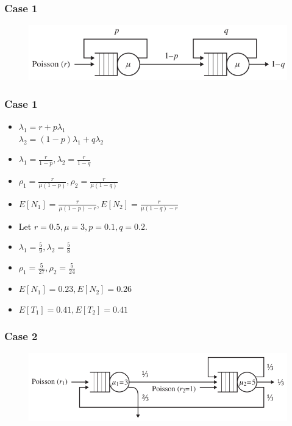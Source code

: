 \documentclass[10pt,notes]{beamer}
\begin{document}
\begin{frame}
    \frametitle{Case 1}
    \begin{figure}
        \includegraphics[width=0.75\linewidth]{images/case1.png}
    \end{figure}
\end{frame}

\begin{frame}
    \frametitle{Case 1}
    \begin{itemize}
        \item $\lambda_1 = r + p\lambda_1$ \\
            $\lambda_2 = (1 - p)\lambda_1 + q\lambda_2$ \\
        \item $\lambda_1 = \frac{r}{1 - p}, \lambda_2 = \frac{r}{1 - q}$
        \item $\rho_1 = \frac{r}{\mu(1 - p)}, \rho_2 = \frac{r}{\mu(1 - q)}$
        \item $E[N_1] = \frac{r}{\mu(1 - p) - r}, E[N_2] = \frac{r}{\mu(1 - q) - r}$
        \item Let $r = 0.5, \mu = 3, p = 0.1, q = 0.2$.
        \item $\lambda_1 = \frac{5}{9}, \lambda_2 = \frac{5}{8}$
        \item $\rho_1 = \frac{5}{27}, \rho_2 = \frac{5}{24}$
        \item $E[N_1] = 0.23, E[N_2] = 0.26$
        \item $E[T_1] = 0.41, E[T_2] = 0.41$
    \end{itemize}
\end{frame}

\begin{frame}
    \frametitle{Case 2}
    \begin{figure}
        \includegraphics[width=0.7\linewidth]{images/case2.png}
    \end{figure}
\end{frame}
\end{document}
